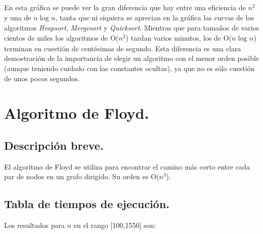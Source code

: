 \documentclass[11pt,a4paper]{article}
\begin{document}
			En esta gráfica se puede ver la gran diferencia que hay entre una eficiencia de $n^2$ y una de $n\log_{}n$, tanta que ni siquiera se aprecian en la gráfica las curvas de los algoritmos \textit{Heapsort}, \textit{Mergesort} y \textit{Quicksort}. Mientras que para tamaños de varios cientos de miles los algoritmos de O($n^2$) tardan varios minutos, los de O($n\log_{}n$) terminan en cuestión de centésimas de segundo. Esta diferencia es una clara demostración de la importancia de elegir un algoritmo con el menor orden posible (aunque teniendo cuidado con las constantes ocultas), ya que no es sólo cuestión de unos pocos segundos.

\newpage

	\section{Algoritmo de Floyd.}

		\subsection{Descripción breve.}

			\par
			El algoritmo de Floyd se utiliza para encontrar el camino más corto entre cada par de nodos en un grafo dirigido. Su orden es O($n^3$).

		\subsection{Tabla de tiempos de ejecución.}

			\par
			Los resultados para $n$ en el rango [100,1550] son:

			\vspace{0.5cm}
\end{document}
